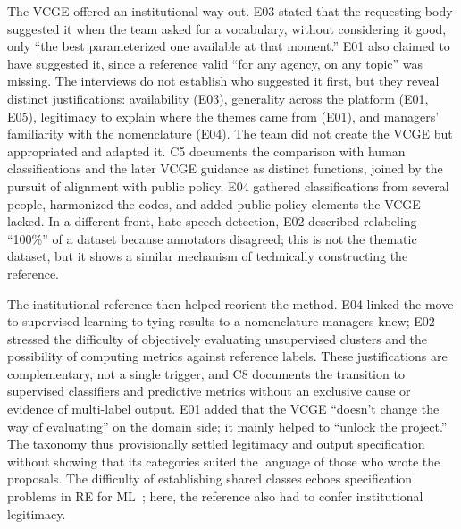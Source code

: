 \documentclass[sigconf,nonacm]{acmart}
\begin{document}
The VCGE offered an institutional way out. E03 stated that the requesting body suggested it when the team asked for a vocabulary, without considering it good, only ``the best parameterized one available at that moment.'' E01 also claimed to have suggested it, since a reference valid ``for any agency, on any topic'' was missing. The interviews do not establish who suggested it first, but they reveal distinct justifications: availability (E03), generality across the platform (E01, E05), legitimacy to explain where the themes came from (E01), and managers' familiarity with the nomenclature (E04). The team did not create the VCGE but appropriated and adapted it. C5 documents the comparison with human classifications and the later VCGE guidance as distinct functions, joined by the pursuit of alignment with public policy. E04 gathered classifications from several people, harmonized the codes, and added public-policy elements the VCGE lacked. In a different front, hate-speech detection, E02 described relabeling ``100\%'' of a dataset because annotators disagreed; this is not the thematic dataset, but it shows a similar mechanism of technically constructing the reference.

The institutional reference then helped reorient the method. E04 linked the move to supervised learning to tying results to a nomenclature managers knew; E02 stressed the difficulty of objectively evaluating unsupervised clusters and the possibility of computing metrics against reference labels. These justifications are complementary, not a single trigger, and C8 documents the transition to supervised classifiers and predictive metrics without an exclusive cause or evidence of multi-label output. E01 added that the VCGE ``doesn't change the way of evaluating'' on the domain side; it mainly helped to ``unlock the project.'' The taxonomy thus provisionally settled legitimacy and output specification without showing that its categories suited the language of those who wrote the proposals. The difficulty of establishing shared classes echoes specification problems in RE for ML~\cite{habibullah2023}; here, the reference also had to confer institutional legitimacy.


\end{document}
